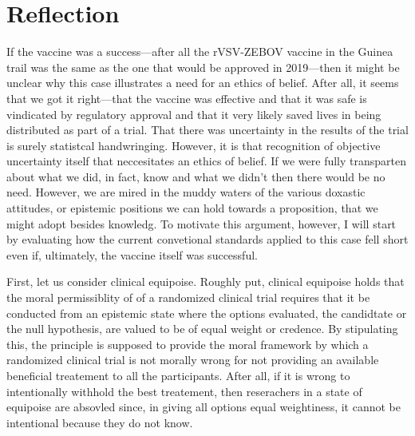 \documentclass[letterpaper,notitlepage,12pt]{article}
\begin{document}
\section{Reflection}

If the vaccine was a success---after all the rVSV-ZEBOV vaccine in the Guinea
trail was the same as the one that would be approved in 2019---then it might be
unclear why this case illustrates a need for an ethics of belief.
After all, it seems that we got it right---that the vaccine was effective and
that it was safe is vindicated by regulatory approval and that it very likely
saved lives in being distributed as part of a trial.
That there was uncertainty in the results of the trial is surely statistcal
handwringing.
However, it is that recognition of objective uncertainty itself that
neccesitates an ethics of belief.
If we were fully transparten about what we did, in fact, know and what we didn't
then there would be no need.
However, we are mired in the muddy waters of the various doxastic attitudes, or
epistemic positions we can hold towards a proposition, that we might adopt
besides knowledg.
To motivate this argument, however, I will start by evaluating how the current
convetional standards applied to this case fell short even if, ultimately, the
vaccine itself was successful.

First, let us consider clinical equipoise.
Roughly put, clinical equipoise holds that the moral permissiblity of of a
randomized clinical trial requires that it be conducted from an epistemic state
where the options evaluated, the candidtate or the null hypothesis, are valued
to be of equal weight or credence.
By stipulating this, the principle is supposed to provide the moral framework by
which a randomized clinical trial is not morally wrong for not providing an
available beneficial treatement to all the participants.
After all, if it is wrong to intentionally withhold the best treatement, then
reserachers in a state of equipoise are absovled since, in giving all options
equal weightiness, it cannot be intentional because they do not know.
\end{document}
